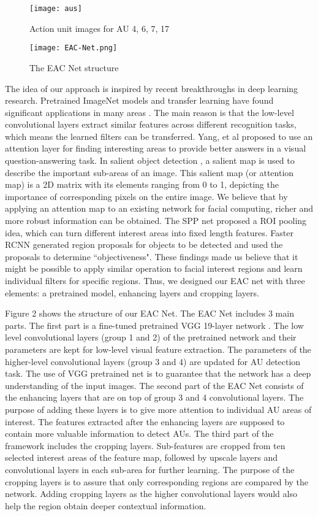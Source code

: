 \documentclass[a4paper, 10pt, conference]{ieeeconf}      %
\begin{document}
   \begin{figure}[thpb]
      \centering
      \texttt{[image: aus]}
      \caption{Action unit images for AU 4, 6, 7, 17}
      \label{fig1}
   \end{figure}


 \begin{figure*}[thpb]
      \centering
      \texttt{[image: EAC-Net.png]}
      \caption{The EAC Net structure}
      \label{fig2}
   \end{figure*}
The idea of our approach is inspired by recent breakthroughs in deep learning research. Pretrained ImageNet models and transfer learning have found significant applications in many areas \cite{p2, p3}. The main reason is that the low-level convolutional layers extract similar features across different recognition tasks, which means the learned filters can be transferred. 
Yang, et al \cite{p4} proposed to use an attention layer for finding interesting areas to provide better answers in a visual question-answering task. In salient object detection \cite{p5}, a salient map is used to describe the important sub-areas of an image. This salient map (or attention map) is a 2D matrix with its elements ranging from 0 to 1, depicting the importance of corresponding pixels on the entire image. We believe that by applying an attention map to an existing network for facial computing, richer and more robust information can be obtained.  
The SPP net \cite{p6} proposed a ROI pooling idea, which can turn different interest areas into fixed length features. Faster RCNN \cite{p7} generated region proposals for objects to be detected and used the proposals to determine ``objectiveness". These findings made us believe that it might be possible to apply similar operation to facial interest regions and learn individual filters for specific regions. 
Thus, we designed our EAC net with three elements: a pretrained model, enhancing layers and cropping layers.


Figure 2 shows the structure of our EAC Net. The EAC Net includes 3 main parts. The first part is a fine-tuned pretrained VGG 19-layer network \cite{p8}. The low level convolutional layers (group 1 and 2) of the pretrained network and their parameters are kept for low-level visual feature extraction. The parameters of the higher-level convolutional layers (group 3 and 4) are updated for AU detection task. The use of VGG pretrained net is to guarantee that the network has a deep understanding of the input images. The second part of the EAC Net consists of the enhancing layers that are on top of group 3 and 4 convolutional layers. The purpose of adding these layers is to give more attention to individual AU areas of interest. The features extracted after the enhancing layers are supposed to contain more valuable information to detect AUs. The third part of the framework includes the cropping layers. Sub-features are cropped from ten selected interest areas of the feature map, followed by upscale layers and convolutional layers in each sub-area for further learning. The purpose of the cropping layers is to assure that only corresponding regions are compared by the network. Adding cropping layers as the higher convolutional layers would also help the region obtain deeper contextual information.
\end{document}
